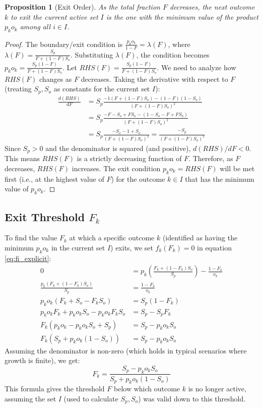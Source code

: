 \documentclass[11pt, letterpaper]{article}
\newtheorem{proposition}{Proposition}
\theoremstyle{definition}
\begin{document}
\begin{proposition}[Exit Order]
As the total fraction $F$ decreases, the next outcome $k$ to exit the current active set $I$ is the one with the minimum value of the product $p_k o_k$ among all $i \in I$.
\end{proposition}
\begin{proof}
The boundary/exit condition is $\frac{p_k o_k}{1 - F} = \lambda(F)$, where $\lambda(F) = \frac{S_p}{F + (1 - F) S_o}$.
Substituting $\lambda(F)$, the condition becomes $p_k o_k = \frac{S_p(1 - F)}{F + (1 - F) S_o}$.
Let $RHS(F) = \frac{S_p(1 - F)}{F + (1 - F) S_o}$. We need to analyze how $RHS(F)$ changes as $F$ decreases.
Taking the derivative with respect to $F$ (treating $S_p, S_o$ as constants for the current set $I$):
\begin{align*}
\frac{d(RHS)}{dF} &= S_p \frac{-1(F + (1 - F) S_o) - (1 - F)(1 - S_o)}{(F + (1 - F) S_o)^2} \\
           &= S_p \frac{-F - S_o + F S_o - (1 - S_o - F + F S_o)}{(F + (1 - F) S_o)^2} \\
           &= S_p \frac{-S_o - 1 + S_o}{(F + (1 - F) S_o)^2} = \frac{-S_p}{(F + (1 - F) S_o)^2}
\end{align*}
Since $S_p > 0$ and the denominator is squared (and positive), $d(RHS)/dF < 0$. This means $RHS(F)$ is a strictly decreasing function of $F$.
Therefore, as $F$ decreases, $RHS(F)$ increases. The exit condition $p_k o_k = RHS(F)$ will be met first (i.e., at the highest value of $F$) for the outcome $k \in I$ that has the minimum value of $p_k o_k$.
\end{proof}

\subsection{Exit Threshold \texorpdfstring{$F_k$}{Fk}}

To find the value $F_k$ at which a specific outcome $k$ (identified as having the minimum $p_k o_k$ in the current set $I$) exits, we set $f_k(F_k) = 0$ in equation \eqref{eq:fi_explicit}:
\begin{align*}
    0 &= p_k \left( \frac{F_k + (1 - F_k) S_o}{S_p} \right) - \frac{1 - F_k}{o_k} \\
    \frac{p_k (F_k + (1 - F_k) S_o)}{S_p} &= \frac{1 - F_k}{o_k} \\
    p_k o_k (F_k + S_o - F_k S_o) &= S_p (1 - F_k) \\
    p_k o_k F_k + p_k o_k S_o - p_k o_k F_k S_o &= S_p - S_p F_k \\
    F_k (p_k o_k - p_k o_k S_o + S_p) &= S_p - p_k o_k S_o \\
    F_k (S_p + p_k o_k (1 - S_o)) &= S_p - p_k o_k S_o
\end{align*}
Assuming the denominator is non-zero (which holds in typical scenarios where growth is finite), we get:
\begin{equation}
    F_k = \frac{S_p - p_k o_k S_o}{S_p + p_k o_k (1 - S_o)} \label{eq:Fk_formula}
\end{equation}
This formula gives the threshold $F$ below which outcome $k$ is no longer active, assuming the set $I$ (used to calculate $S_p, S_o$) was valid down to this threshold.
\end{document}
